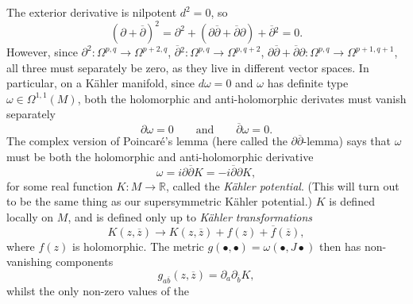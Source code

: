 The exterior derivative is nilpotent $d^2 = 0$, so
\begin{equation}
  (\partial + \overline{\partial}{})^2 = \partial^2 + (\partial \overline{\partial}{} + \overline{\partial}{}\partial) + \overline{\partial}{}^2 = 0.
\end{equation}
However, since $\partial^2 \colon \Omega^{p, q} \to \Omega^{p + 2, q}$, $\overline{\partial}{}^2 \colon \Omega^{p, q} \to \Omega^{p, q + 2}$, $\partial \overline{\partial}{} + \overline{\partial}{} \partial \colon \Omega^{p, q} \to \Omega^{p + 1, q+ 1}$, all three must separately be zero, as they live in different vector spaces.
In particular, on a Kähler manifold, since $d \omega = 0$ and $\omega$ has definite type $\omega \in \Omega^{1,1}(M)$, both the holomorphic and anti-holomorphic derivates must vanish separately
\begin{equation}
  \partial \omega = 0 \qquad \text{and} \qquad \overline{\partial}{} \omega = 0.
\end{equation}
The complex version of Poincaré's lemma (here called the $\partial \overline{\partial}{}$-lemma) says that $\omega$ must be both the holomorphic and anti-holomorphic derivative
\begin{equation}
  \omega = i \partial \overline{\partial}{} K = -i \overline{\partial}{} \partial K,
\end{equation}
for some real function $K \colon M \to \mathbb{R}$, called the \emph{Kähler potential}.
(This will turn out to be the same thing as our supersymmetric Kähler potential.)
$K$ is defined locally on $M$, and is defined only up to \emph{Kähler transformations}
\begin{equation}
  K(z, \overline{z}{}) \to K(z, \overline{z}{}) + f(z) + \overline{f}{}(\overline{z}{}),
\end{equation}
where $f(z)$ is holomorphic.
The metric $g(\bullet, \bullet) = \omega(\bullet, J \bullet)$ then has non-vanishing components
\begin{equation}
  g_{a \overline{b}{}} (z, \overline{z}{}) = \partial_a \partial_{\overline{b}{}} K,
\end{equation}
whilst the only non-zero values of the
